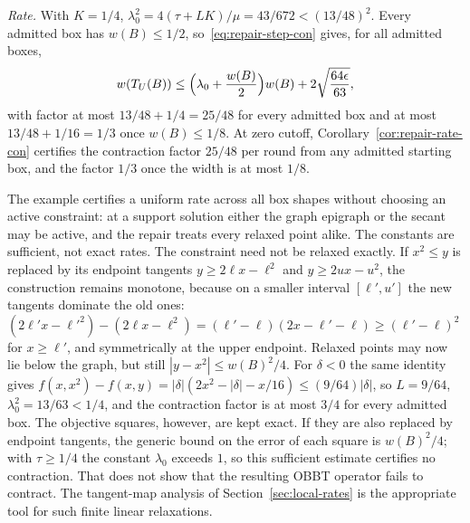 \begin{example}
\emph{Rate.} With $K=1/4$, $\lambda_0^2=4(\tau+LK)/\mu=43/672<(13/48)^2$.
Every admitted box has $w(B)\le1/2$, so~\eqref{eq:repair-step-con} gives,
for all admitted boxes,
\[
 w(T_U(B))\le\Bigl(\lambda_0+\frac{w(B)}2\Bigr)w(B)
  +2\sqrt{\frac{64\epsilon}{63}},
\]
with factor at most $13/48+1/4=25/48$ for every admitted box and at most
$13/48+1/16=1/3$ once $w(B)\le1/8$. At zero cutoff,
Corollary~\ref{cor:repair-rate-con} certifies the contraction factor
$25/48$ per round from any admitted starting box, and the factor $1/3$ once
the width is at most $1/8$.
\end{example}

The example certifies a uniform rate across all box shapes without
choosing an active constraint: at a support solution either the graph
epigraph or the secant may be active, and the repair treats every relaxed
point alike. The constants are sufficient, not exact rates. The constraint
need not be relaxed exactly. If $x^2\le y$ is replaced by its endpoint
tangents $y\ge2\ell x-\ell^2$ and $y\ge2ux-u^2$, the construction remains
monotone, because on a smaller interval $[\ell',u']$ the new tangents
dominate the old ones: $(2\ell'x-\ell'^2)-(2\ell x-\ell^2)
=(\ell'-\ell)(2x-\ell'-\ell)\ge(\ell'-\ell)^2$ for $x\ge\ell'$, and
symmetrically at the upper endpoint. Relaxed points may now lie below the
graph, but still $|y-x^2|\le w(B)^2/4$. For $\delta<0$ the same
identity gives $f(x,x^2)-f(x,y)=|\delta|(2x^2-|\delta|-x/16)\le(9/64)|\delta|$,
so $L=9/64$, $\lambda_0^2=13/63<1/4$, and the contraction factor is at most
$3/4$ for every admitted box. The objective squares, however, are kept
exact. If they are also replaced by endpoint tangents, the generic bound on
the error of each square is $w(B)^2/4$; with $\tau\ge1/4$ the constant
$\lambda_0$ exceeds $1$, so this sufficient estimate certifies no
contraction. That does not show that the resulting OBBT operator fails to
contract. The tangent-map analysis of Section~\ref{sec:local-rates} is the
appropriate tool for such finite linear relaxations.

